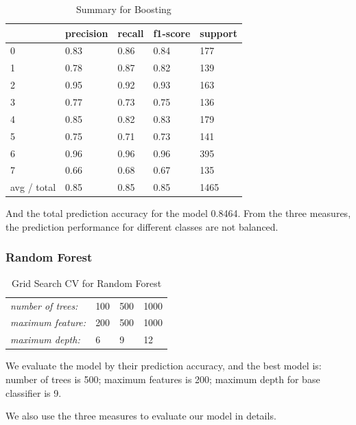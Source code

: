\documentclass[paper=a4, fontsize=11pt]{scrartcl}
\begin{document}
\begin{table}[ht]
\centering
\caption{Summary for Boosting}
\begin{tabular}{lllll}
\hline
            & precision & recall & f1-score & support \\ \hline
0           & 0.83      & 0.86   & 0.84     & 177     \\
1           & 0.78      & 0.87   & 0.82     & 139     \\
2           & 0.95      & 0.92   & 0.93     & 163     \\
3           & 0.77      & 0.73   & 0.75     & 136     \\
4           & 0.85      & 0.82   & 0.83     & 179     \\
5           & 0.75      & 0.71   & 0.73     & 141     \\
6           & 0.96      & 0.96   & 0.96     & 395     \\
7           & 0.66      & 0.68   & 0.67     & 135     \\ \hline
avg / total & 0.85      & 0.85   & 0.85     & 1465    \\ \hline
\end{tabular}
\end{table}
\newpage
And the total prediction accuracy for the model 0.8464. From the three measures, the prediction performance for different classes are not balanced.


\subsubsection*{Random Forest}

\begin{table}[ht]
\centering
\caption{Grid Search CV for Random Forest}
\begin{tabular}{llll}
\hline
\textit{number of trees:} & 100 & 500 & 1000 \\
\textit{maximum feature:}     &200  & 500 & 1000   \\
\textit{maximum depth:}    & 6   & 9   & 12  \\ \hline
\end{tabular}
\end{table}
We evaluate the model by their prediction accuracy, and the best model is: number of trees is 500; maximum features is 200; maximum depth for base classifier is 9.

We also use the three measures to evaluate our model in details.
\end{document}
